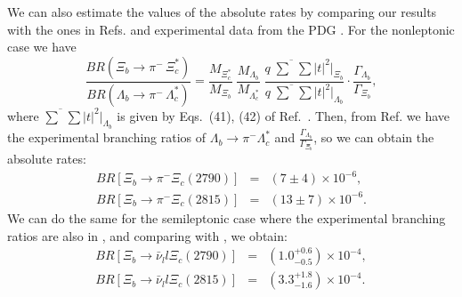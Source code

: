\documentclass{PoS}
\begin{document}
We can also estimate the values of the absolute rates by comparing our results with the ones in Refs. \cite{weihong,weisemi} and experimental data from the PDG \cite{pdg}.
For the nonleptonic case we have
\begin{equation}\label{eq:BR_ratio}
  \frac{BR(\Xi_b \to \pi^-\, \Xi^*_c)}{BR(\Lambda_b \to \pi^-\, \Lambda^*_c)}
  = \frac{M_{\Xi^*_c}}{M_{\Xi_b}}\; \frac{M_{\Lambda_b}}{M_{\Lambda^*_c}} \;\frac{q \;\overline{\sum}\sum |t|^2 \Big|_{\Xi_{b}}}{q \;\overline{\sum}\sum |t|^2 \Big|_{\Lambda_b}}\cdot \frac{\Gamma_{\Lambda_b}}{\Gamma_{\Xi_b}},
\end{equation}
where $\overline{\sum}\sum |t|^2 \Big|_{\Lambda_b}$ is given by Eqs.~(41), (42) of Ref.~\cite{weihong}.
Then, from Ref.\cite{pdg} we have the experimental branching ratios of $\Lambda_b \to \pi^- \Lambda_c^*$ and $\frac{\Gamma_{\Lambda_b}}{\Gamma_{\Xi_b}}$, so
 we can obtain the absolute rates:
\begin{eqnarray}\label{eq:BR_Xib}
  BR[\Xi_b \to \pi^- \Xi_c(2790)] &=& (7\pm 4)\times 10^{-6},  \label{eq:BR_Xia1}\\
  BR[\Xi_b \to \pi^- \Xi_c(2815)] &=& (13\pm 7)\times 10^{-6}.  \label{eq:BR_Xia2}
\end{eqnarray}
We can do the same for the semileptonic case where the experimental branching ratios are also in \cite{pdg}
, and comparing with \cite{weisemi}, we obtain:
\begin{eqnarray}\label{eq:BR_PDG}
  BR[\Xi_b \to \bar \nu_l l \Xi_c(2790)] &=& \left( 1.0  ^{+0.6}_{-0.5}  \right) \times 10^{-4}, \label{eq:BR_Xib1} \\
  BR[\Xi_b \to \bar \nu_l l \Xi_c(2815)] &=& \left( 3.3 ^{+1.8}_{-1.6} \right) \times 10^{-4}.\label{eq:BR_Xib2}
\end{eqnarray}
\end{document}
